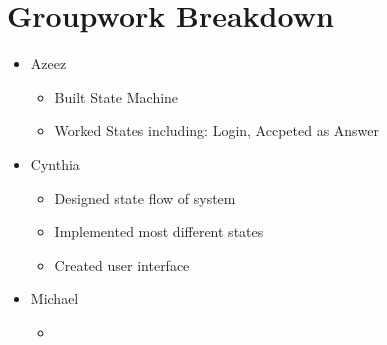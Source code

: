\documentclass{article}
\begin{document}
\section{Groupwork Breakdown}
\begin{itemize}
    \item Azeez
          \begin{itemize}
              \item Built State Machine
              \item Worked States including: Login, Accpeted as Answer
          \end{itemize}
    \item Cynthia
          \begin{itemize}
              \item Designed state flow of system
              \item Implemented most different states
              \item Created user interface
          \end{itemize}
    \item Michael
          \begin{itemize}
              \item
          \end{itemize}
\end{itemize}



\end{document}
